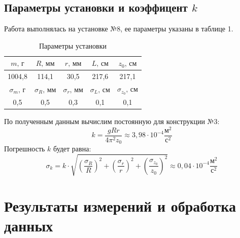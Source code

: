\documentclass[a4paper,12pt]{article}
\begin{document}
    \subsection*{Параметры установки и коэффицент $k$}
    Работа выполнялась на установке №8, ее параметры указаны в таблице 1.
    \begin{table}[H]
	    \begin{center}
		    \begin{tabular}{|c|c|c|c|c|}
			    \hline
			    $m \text{, г}$  & $R\text{, мм}$ & $r\text{, мм}$ & $L\text{, см}$ & $z_0\text{, см}$\\
			    \hline
			    1004,8 & 114,1 & 30,5 & 217,6 & 217,1\\
			    \hline
			    \hline
			    $\sigma_m \text{, г}$  & $\sigma_R\text{, мм}$ & $\sigma_r\text{, мм}$ & $\sigma_L\text{, см}$ & $\sigma_{z_0}\text{, см}$\\
			    \hline
			    0,5 & 0,5 & 0,3 & 0,1 & 0,1\\
			    \hline 
		    \end{tabular}
	    \caption{Параметры установки}
        \end{center}
	\end{table}
    По полученным данным вычислим постоянную для конструкции №3:
	$$k = \frac{gRr}{4\pi^2z_0} \approx 3,98\cdot 10^{-4} \frac{м^2}{с^2}$$
    Погрешность $k$ будет равна:
	$$\sigma_k = k \cdot \sqrt{\left( \frac{\sigma_R}{R}\right)^2 + \left( \frac{\sigma_r}{r}\right)^2 + \left( \frac{\sigma_{z_0}}{z_0}\right)^2} \approx 0,04 \cdot 10^{-4} \frac{\text{м}^2}{\text{с}^2}$$
	
\section{Результаты измерений и обработка данных}
\end{document}
